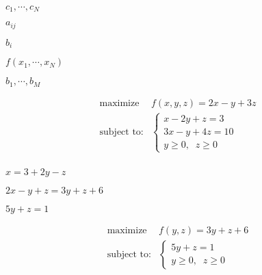 \documentclass{article}
\def\lthtmlcheckvsize{\ifdim\ht\sizebox<\vsize 
  \ifdim\wd\sizebox<\hsize\expandafter\hfill\fi \expandafter\vfill
  \else\expandafter\vss\fi}%
\begin{document}
{\newpage\clearpage
{}%
$ c_1,\cdots,c_N$%
\lthtmlindisplaymathZ
\lthtmlcheckvsize\clearpage}

{\newpage\clearpage
{}%
$ a_{ij}$%
\lthtmlindisplaymathZ
\lthtmlcheckvsize\clearpage}

{\newpage\clearpage
{}%
$ b_i$%
\lthtmlindisplaymathZ
\lthtmlcheckvsize\clearpage}

{\newpage\clearpage
{}%
$ f(x_1,\cdots,x_N)$%
\lthtmlindisplaymathZ
\lthtmlcheckvsize\clearpage}

{\newpage\clearpage
{}%
$ b_1,\cdots,b_M$%
\lthtmlindisplaymathZ
\lthtmlcheckvsize\clearpage}

{\newpage\clearpage
{}%
\begin{displaymath}\begin{array}{ll}
\mbox{maximize}    & f(x,y,z)=2x-y+3z \\
\mbox{subject to:} &
\left\{\begin{array}{l} x-2y+z=3\\3x-y+4z=10\\
y \ge 0,\;\; z\ge 0\end{array}\right.\\
\end{array}\end{displaymath}%
\lthtmldisplayZ
\lthtmlcheckvsize\clearpage}

{\newpage\clearpage
{}%
$ x=3+2y-z$%
\lthtmlindisplaymathZ
\lthtmlcheckvsize\clearpage}

{\newpage\clearpage
{}%
$ 2x-y+z=3y+z+6$%
\lthtmlindisplaymathZ
\lthtmlcheckvsize\clearpage}

{\newpage\clearpage
{}%
$ 5y+z=1$%
\lthtmlindisplaymathZ
\lthtmlcheckvsize\clearpage}

{\newpage\clearpage
{}%
\begin{displaymath}\begin{array}{ll}
\mbox{maximize}    & f(y,z)=3y+z+6 \\
\mbox{subject to:} &
\left\{\begin{array}{l} 5y+z=1 \\
y \ge 0,\;\; z\ge 0\end{array}\right.\\
\end{array}\end{displaymath}%
\lthtmldisplayZ
\lthtmlcheckvsize\clearpage}
\end{document}
